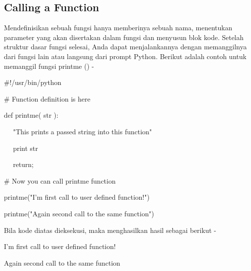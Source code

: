 \documentclass[a4paper,12pt]{report}
\begin{document}
\subsection*{Calling a Function}
 \par
\begin{adjustwidth}{0.03in}{0.03in}
Mendefinisikan sebuah fungsi hanya memberinya sebuah nama, menentukan parameter yang akan disertakan dalam fungsi dan menyusun blok kode. Setelah struktur dasar fungsi selesai, Anda dapat menjalankannya dengan memanggilnya dari fungsi lain atau langsung dari prompt Python. Berikut adalah contoh untuk memanggil fungsi printme () -\end{adjustwidth}
 \par
\noindent 
 \hspace*{0.5in}  $  \#  $!/usr/bin/python \par
\vspace{12pt}
\noindent 
 \hspace*{0.5in}  $  \#  $ Function definition is here \par
\noindent 
 \hspace*{0.5in} def printme( str ): \par
\noindent 
~~  \hspace*{0.5in}  \hspace*{0.5in} "This prints a passed string into this function" \par
\noindent 
~~  \hspace*{0.5in} print str \par
\noindent 
~~  \hspace*{0.5in} return; \par
\vspace{12pt}
\noindent 
 \hspace*{0.5in}  $  \#  $ Now you can call printme function \par
\noindent 
 \hspace*{0.5in} printme("I'm first call to user defined function!") \par
\noindent 
 \hspace*{0.5in} printme("Again second call to the same function") \par
\begin{adjustwidth}{0.03in}{0.03in}
Bila kode diatas dieksekusi, maka menghasilkan hasil sebagai berikut -\end{adjustwidth}
 \par
\noindent 
 \hspace*{0.5in} I'm first call to user defined function! \par
\noindent 
 \hspace*{0.5in} Again second call to the same function \par
\vspace{20pt}
\end{document}
